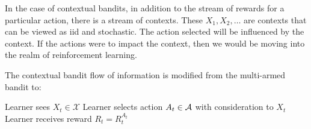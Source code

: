 \documentclass[11pt]{article}
\begin{document}
In the case of contextual bandits, in addition to the stream of rewards for a particular action, there is a stream of contexts.  These $X_1, X_2, \ldots$ are contexts that can be viewed as iid and stochastic.  The action selected will be influenced by the context.  If the actions were to impact the context, then we would be moving into the realm of reinforcement learning.

The contextual bandit flow of information is modified from the multi-armed bandit to:

\begin{algorithmic}[1]
\STATE Learner sees $X_t \in \mathcal{X}$
\STATE Learner selects action $A_t \in \mathcal{A}$ with consideration to $X_t$
\STATE Learner receives reward $R_t = R^{A_t}_t$
\ENDFOR
\end{algorithmic}


\end{document}
